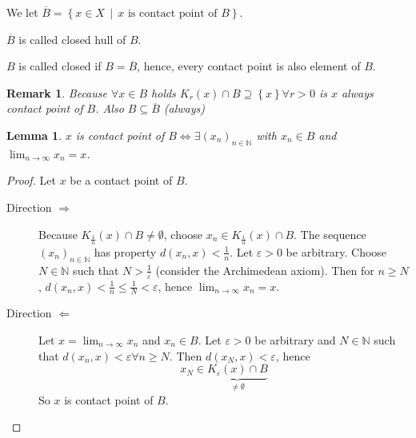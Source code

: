 \documentclass{article}
\newtheorem{lemma}{Lemma}  \numberwithin{lemma}{section}
\newtheorem{remark}{Remark}  \numberwithin{remark}{section}
\newcommand{\set}[1]{\left\{#1\right\}}
\newcommand{\setdef}[2]{\left\{\left.#1\,\middle|\,#2\right.\right\}}
\begin{document}
We let $\overline{B} = \setdef{x \in X}{x \text{ is contact point of } B}$.

$\overline{B}$ is called closed hull of $B$.

$B$ is called closed if $B = \overline{B}$, hence, every contact point is also element of $B$.

\begin{remark}
  Because $\forall x \in B$ holds $K_r(x) \cap B \supseteq \set{x} \forall r > 0$ is $x$ always contact point of $B$.
  Also $B \subseteq \overline{B}$ (always)
\end{remark}

\begin{lemma}
  $x$ is contact point of $B \iff \exists (x_n)_{n\in\mathbb N}$ with $x_n \in B$ and $\lim_{n\to\infty} x_n = x$.
\end{lemma}
\begin{proof}
  Let $x$ be a contact point of $B$.

  \begin{description}
    \item[Direction $\mathbf\Rightarrow$]
      Because $K_{\frac1n}(x) \cap B \neq \emptyset$, choose $x_n \in K_{\frac1n}(x) \cap B$.
      The sequence $(x_n)_{n\in\mathbb N}$ has property $d(x_n, x) < \frac1n$.
      Let $\varepsilon > 0$ be arbitrary. Choose $N \in \mathbb N$ such that $N > \frac1\varepsilon$ (consider the Archimedean axiom).
      Then for $n \geq N$, $d(x_n, x) < \frac1n \leq \frac1N < \varepsilon$, hence $\lim_{n\to\infty} x_n = x$.

    \item[Direction $\mathbf\Leftarrow$]
      Let $x = \lim_{n\to\infty} x_n$ and $x_n \in B$.
      Let $\varepsilon > 0$ be arbitrary and $N \in \mathbb N$ such that $d(x_n, x) < \varepsilon \forall n \geq N$.
      Then $d(x_N, x) < \varepsilon$, hence
      \[ x_N \in \underbrace{K_{\varepsilon}(x) \cap B}_{\neq \emptyset} \]
      So $x$ is contact point of $B$.
  \end{description}
\end{proof}
\end{document}
